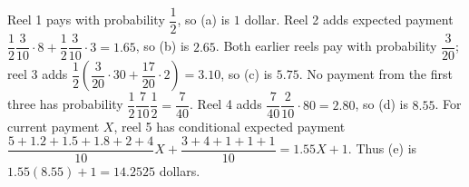 Reel 1 pays with probability $\dfrac{1}{2}$, so (a) is $\boxed{1}$ dollar. Reel 2 adds expected payment $\dfrac{1}{2}\dfrac{3}{10}\cdot8+\dfrac{1}{2}\dfrac{3}{10}\cdot3=1.65$, so (b) is $\boxed{2.65}$. Both earlier reels pay with probability $\dfrac{3}{20}$; reel 3 adds $\dfrac{1}{2}(\dfrac{3}{20}\cdot30+\dfrac{17}{20}\cdot2)=3.10$, so (c) is $\boxed{5.75}$. No payment from the first three has probability $\dfrac{1}{2}\dfrac{7}{10}\dfrac{1}{2}=\dfrac{7}{40}$. Reel 4 adds $\dfrac{7}{40}\dfrac{2}{10}\cdot80=2.80$, so (d) is $\boxed{8.55}$. For current payment $X$, reel 5 has conditional expected payment $\dfrac{5+1.2+1.5+1.8+2+4}{10}X+\dfrac{3+4+1+1+1}{10}=1.55X+1$. Thus (e) is $1.55(8.55)+1=\boxed{14.2525}$ dollars.
